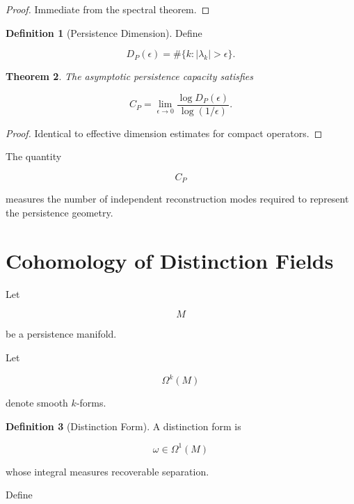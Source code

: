 \documentclass[12pt,oneside]{article}
\newtheorem{theorem}{Theorem}[section] \newtheorem{lemma}[theorem]{Lemma} \newtheorem{proposition}[theorem]{Proposition} \newtheorem{corollary}[theorem]{Corollary}
\theoremstyle{definition}
\newtheorem{definition}[theorem]{Definition} \newtheorem{axiom}[theorem]{Axiom} \newtheorem{remark}[theorem]{Remark} \newtheorem{example}[theorem]{Example}
\begin{document}
\begin{proof}

Immediate from the spectral theorem.

\end{proof}

\begin{definition}[Persistence Dimension]

Define

\[
D_P(\epsilon)
=
\#\{
k:
|\lambda_k|
>
\epsilon
\}.
\]

\end{definition}

\begin{theorem}

The asymptotic persistence capacity satisfies

\[
C_P
=
\lim_{\epsilon\to0}
\frac{
\log D_P(\epsilon)
}
{
\log(1/\epsilon)
}.
\]

\end{theorem}

\begin{proof}

Identical to effective dimension estimates for compact operators.

\end{proof}

The quantity

\[
C_P
\]

measures the number of independent reconstruction modes required to represent the persistence geometry.

\section{Cohomology of Distinction Fields}

Let

\[
M
\]

be a persistence manifold.

Let

\[
\Omega^k(M)
\]

denote smooth \(k\)-forms.

\begin{definition}[Distinction Form]

A distinction form is

\[
\omega
\in
\Omega^1(M)
\]

whose integral measures recoverable separation.

\end{definition}

Define
\end{document}
